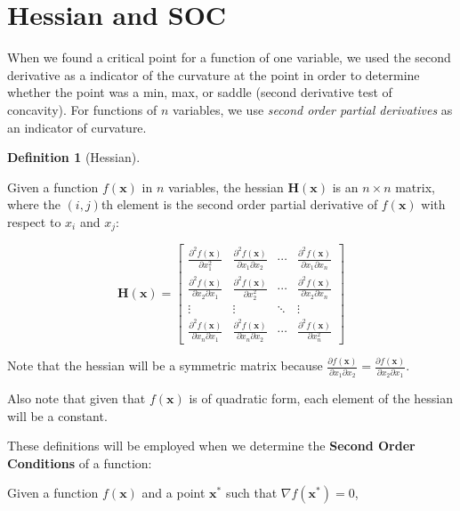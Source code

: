 \documentclass[
  letterpaper,
]{book}
\theoremstyle{definition}
\newtheorem{definition}{Definition}[chapter]
\theoremstyle{definition}
\theoremstyle{plain}
\theoremstyle{definition}
\theoremstyle{plain}
\theoremstyle{plain}
\theoremstyle{remark}
\begin{document}
\hypertarget{hessian-and-soc}{%
\section{Hessian and SOC}\label{hessian-and-soc}}

When we found a critical point for a function of one variable, we used
the second derivative as a indicator of the curvature at the point in
order to determine whether the point was a min, max, or saddle (second
derivative test of concavity). For functions of \(n\) variables, we use
\emph{second order partial derivatives} as an indicator of curvature.

\leavevmode{}%
\begin{definition}[Hessian]\label{def-}

Given a function \(f(\mathbf{x})\) in \(n\) variables, the hessian
\(\mathbf{H(x)}\) is an \(n\times n\) matrix, where the \((i,j)\)th
element is the second order partial derivative of \(f(\mathbf{x})\) with
respect to \(x_i\) and \(x_j\):

\[\mathbf{H(x)}=\begin{bmatrix} \frac{\partial^2 f(\mathbf{x})}{\partial x_1^2}&\frac{\partial^2f(\mathbf{x})}{\partial x_1 \partial x_2}& \cdots & \frac{\partial^2 f(\mathbf{x})}{\partial x_1 \partial x_n}\\ \frac{\partial^2 f(\mathbf{x})}{\partial x_2 \partial x_1}&\frac{\partial^2f(\mathbf{x})}{\partial x_2^2}& \cdots & \frac{\partial^2 f(\mathbf{x})}{\partial x_2 \partial x_n}\\ \vdots & \vdots & \ddots & \vdots \\ \frac{\partial^2 f(\mathbf{x})}{\partial x_n \partial x_1}&\frac{\partial^2f(\mathbf{x})}{\partial x_n \partial x_2}& \cdots & \frac{\partial^2 f(\mathbf{x})}{\partial x_n^2} \end{bmatrix}\]

\end{definition}

Note that the hessian will be a symmetric matrix because
\(\frac{\partial f(\mathbf{x})}{\partial x_1\partial x_2} = \frac{\partial f(\mathbf{x})}{\partial x_2\partial x_1}\).

Also note that given that \(f(\mathbf{x})\) is of quadratic form, each
element of the hessian will be a constant.

These definitions will be employed when we determine the \textbf{Second
Order Conditions} of a function:

Given a function \(f(\mathbf{x})\) and a point \(\mathbf{x}^*\) such
that \(\nabla f(\mathbf{x}^*)=0\),
\end{document}
